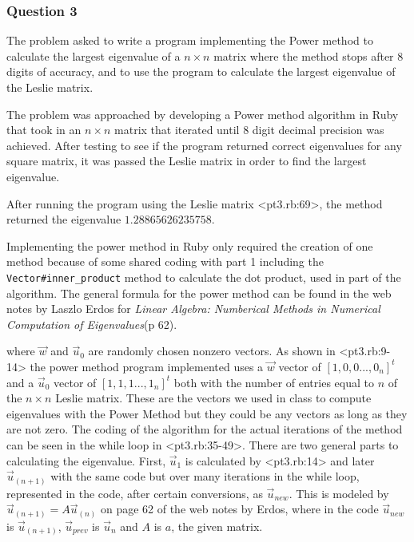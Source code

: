 \documentclass[letterpaper,11pt]{article}
\begin{document}
\subsubsection{Question 3}

The problem asked to write a program implementing the Power method to calculate
the largest eigenvalue of a $n \times n$ matrix where the method stops after 8
digits of accuracy, and to use the program to calculate the largest eigenvalue
of the Leslie matrix.

The problem was approached by developing a Power method algorithm in Ruby that
took in an $n \times n$ matrix that iterated until 8 digit decimal precision was
achieved.
After testing to see if the program returned correct eigenvalues for any square
matrix, it was passed the Leslie matrix in order to find the largest eigenvalue.

After running the program using the Leslie matrix <pt3.rb:69>, the method
returned the eigenvalue $1.28865626235758$.

Implementing the power method in Ruby only required the creation of one method
because of some shared coding with part 1 including the
\texttt{Vector\#inner\_product} method to calculate the dot product,
used in part of the algorithm.
The general formula for the power method can be found in the web notes by Laszlo Erdos
for \textit{Linear Algebra: Numberical Methods in Numerical Computation of Eigenvalues}(p 62).



where $\vec{w}$ and $\vec{u}_0$ are randomly chosen nonzero vectors.
As shown in <pt3.rb:9-14> the power method program implemented uses a $\vec{w}$
vector of $[1,0,0 ... ,0_n]^t$
and a $\vec{u}_0$ vector of
$[1,1,1 ... ,1_n]^t$ both with
the number of entries equal to $n$ of the $n \times n$ Leslie matrix.
These are the vectors we used in class to compute eigenvalues with the Power Method
but they could be any vectors as long as they are not zero.
The coding of the algorithm for the actual iterations of the method can be seen in
the while loop in <pt3.rb:35-49>.
There are two general parts to calculating the eigenvalue.
First, $\vec{u}_1$ is calculated by <pt3.rb:14> and later $\vec{u}_{(n+1)}$ with the
same code but over many iterations in the while loop, represented in the code,
after certain conversions, as $\vec{u}_{new}$.
This is modeled by $\vec{u}_{(n+1)} = A\vec{u}_{(n)}$ on page 62 of the web notes by Erdos,
where in the code $\vec{u}_{new}$ is $\vec{u}_{(n+1)}$, $\vec{u}_{prev}$ is $\vec{u}_n$ and
$A$ is $a$, the given matrix.
\end{document}
